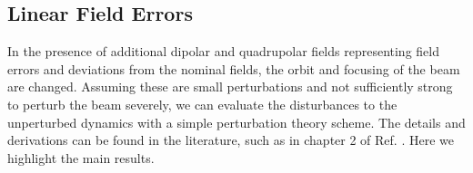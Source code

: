 \subsection{Linear Field Errors}
\label{sec:field_err}

In the presence of additional dipolar and quadrupolar fields representing field errors and deviations from the nominal fields, the orbit and focusing of the beam are changed. Assuming these are small perturbations and not sufficiently strong to perturb the beam severely, we can evaluate the disturbances to the unperturbed dynamics with a simple perturbation theory scheme. The details and derivations can be found in the literature, such as in chapter 2 of Ref. \cite{lee_accelerator_2004}. Here we highlight the main results.
